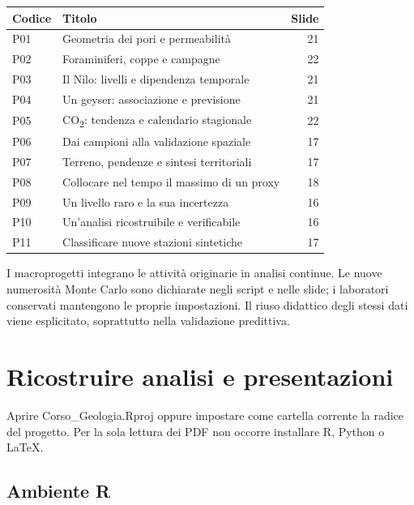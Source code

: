 \documentclass[11pt,a4paper]{article}
\begin{document}
\begin{longtable}{p{1.2cm}p{12cm}r}\toprule Codice & Titolo & Slide\\\midrule\endhead

P01 & Geometria dei pori e permeabilità & 21\\

P02 & Foraminiferi, coppe e campagne & 22\\

P03 & Il Nilo: livelli e dipendenza temporale & 21\\

P04 & Un geyser: associazione e previsione & 21\\

P05 & CO\textsubscript{2}: tendenza e calendario stagionale & 22\\

P06 & Dai campioni alla validazione spaziale & 17\\

P07 & Terreno, pendenze e sintesi territoriali & 17\\

P08 & Collocare nel tempo il massimo di un proxy & 18\\

P09 & Un livello raro e la sua incertezza & 16\\

P10 & Un’analisi ricostruibile e verificabile & 16\\

P11 & Classificare nuove stazioni sintetiche & 17\\

\bottomrule\end{longtable}

I macroprogetti integrano le attività originarie in analisi continue. Le nuove numerosità Monte Carlo sono dichiarate negli script e nelle slide; i laboratori conservati mantengono le proprie impostazioni. Il riuso didattico degli stessi dati viene esplicitato, soprattutto nella validazione predittiva.

\newpage\section*{Ricostruire analisi e presentazioni}

Aprire Corso\_Geologia.Rproj oppure impostare come cartella corrente la radice del progetto. Per la sola lettura dei PDF non occorre installare R, Python o LaTeX.

\subsection*{Ambiente R}
\end{document}
